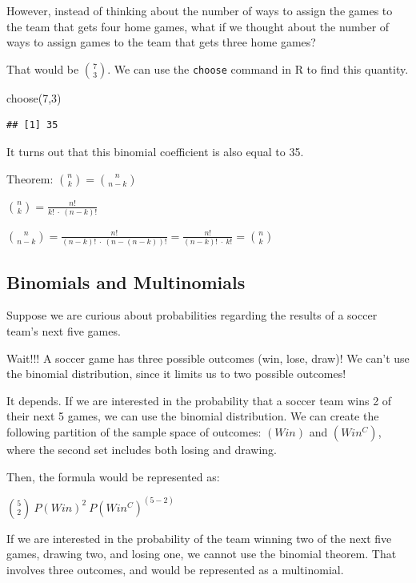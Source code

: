 \documentclass[
]{book}
\newenvironment{Shaded}{\begin{snugshade}}{\end{snugshade}}
\newcommand{\DecValTok}[1]{\textcolor[rgb]{0.00,0.00,0.81}{#1}}
\newcommand{\FunctionTok}[1]{\textcolor[rgb]{0.00,0.00,0.00}{#1}}
\newcommand{\NormalTok}[1]{#1}
\theoremstyle{definition}
\theoremstyle{definition}
\theoremstyle{definition}
\theoremstyle{definition}
\theoremstyle{remark}
\begin{document}
However, instead of thinking about the number of ways to assign the games to the team that gets four home games, what if we thought about the number of ways to assign games to the team that gets three home games?

That would be \(\binom{7}{3}\). We can use the \texttt{choose} command in R to find this quantity.

\begin{Shaded}
\begin{Highlighting}[]
\FunctionTok{choose}\NormalTok{(}\DecValTok{7}\NormalTok{,}\DecValTok{3}\NormalTok{)}
\end{Highlighting}
\end{Shaded}

\begin{verbatim}
## [1] 35
\end{verbatim}

It turns out that this binomial coefficient is also equal to 35.

Theorem: \(\binom{n}{k} = \binom{n}{n-k}\)

\(\binom{n}{k} = \frac{n!}{k!\ \cdot\ (n-k)!}\)

\(\binom{n}{n-k} = \frac{n!}{(n-k)!\ \cdot\ (n-(n-k))!} = \frac{n!}{(n-k)!\ \cdot\ k!} = \binom{n}{k}\)

\hypertarget{binomials-and-multinomials}{%
\subsection{Binomials and Multinomials}\label{binomials-and-multinomials}}

Suppose we are curious about probabilities regarding the results of a soccer team's next five games.

Wait!!! A soccer game has three possible outcomes (win, lose, draw)! We can't use the binomial distribution, since it limits us to two possible outcomes!

It depends. If we are interested in the probability that a soccer team wins 2 of their next 5 games, we can use the binomial distribution. We can create the following partition of the sample space of outcomes: \((Win)\) and \((Win^C)\), where the second set includes both losing and drawing.

Then, the formula would be represented as:

\(\binom{5}{2}\ P(Win)^2\  P(Win^C)^{(5-2)}\)

If we are interested in the probability of the team winning two of the next five games, drawing two, and losing one, we cannot use the binomial theorem. That involves three outcomes, and would be represented as a multinomial.
\end{document}
